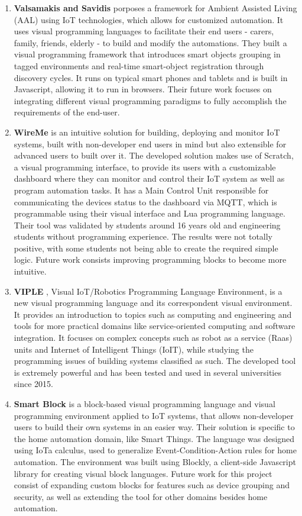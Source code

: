 \begin{enumerate}
    \item \textbf{Valsamakis and Savidis} \cite{Valsamakis2017} porposes a framework for Ambient Assisted Living (AAL) using IoT technologies, which allows for customized automation. It uses visual programming languages to facilitate their end users - carers, family, friends, elderly - to build and modify the automations. They built a visual programming framework that introduces smart objects grouping in tagged environments and real-time smart-object registration through discovery cycles. It runs on typical smart phones and tablets and is built in Javascript, allowing it to run in browsers. Their future work focuses on integrating different visual programming paradigms to fully accomplish the requirements of the end-user.
    \item \textbf{WireMe} \cite{wireme} is an intuitive solution for building, deploying and monitor IoT systems, built with non-developer end users in mind but also extensible for advanced users to built over it. The developed solution makes use of Scratch, a visual programming interface, to provide its users with a customizable dashboard where they can monitor and control their IoT system as well as program automation tasks. It has a Main Control Unit responsible for communicating the devices status to the dashboard via MQTT, which is programmable using their visual interface and Lua programming language. Their tool was validated by students around 16 years old and engineering students without programming experience. The results were not totally positive, with some students not being able to create the required simple logic. Future work consists improving programming blocks to become more intuitive.
    \item \textbf{VIPLE} \cite{viple}, Visual IoT/Robotics Programming Language Environment, is a new visual programming language and its correspondent visual environment. It provides an introduction to topics such as computing and engineering and tools for more practical domains like service-oriented computing and software integration. It focuses on complex concepts such as robot as a service (Raas) units and Internet of Intelligent Things (IoIT), while studying the programming issues of building systems classified as such. The developed tool is extremely powerful and has been tested and used in several universities since 2015.
    \item \textbf{Smart Block} \cite{smart_block} is a block-based visual programming language and visual programming environment applied to IoT systems, that allows non-developer users to build their own systems in an easier way. Their solution is specific to the home automation domain, like Smart Things. The language was designed using IoTa calculus, used to generalize Event-Condition-Action rules for home automation. The environment was built using Blockly, a client-side Javascript library for creating visual block languages. Future work for this project consist of expanding custom blocks for features such as device grouping and security, as well as extending the tool for other domains besides home automation.

\end{enumerate}
